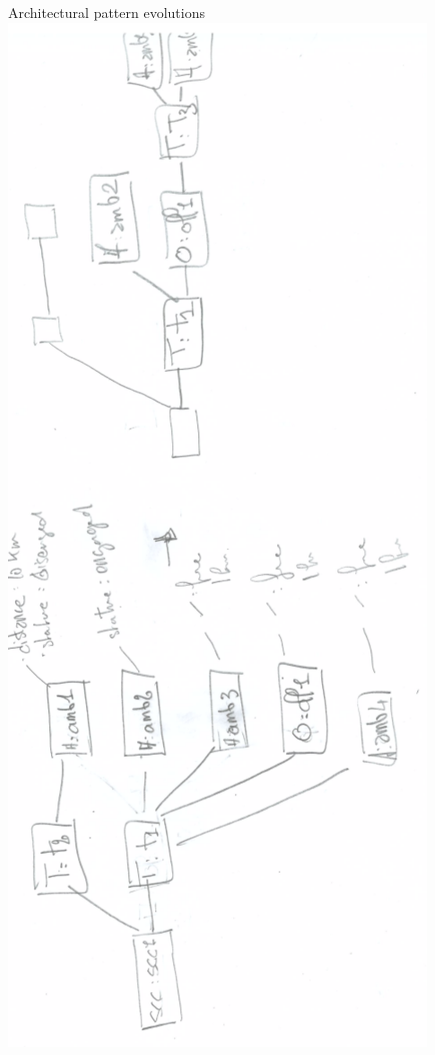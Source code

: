 \documentclass{beamer}
\begin{document}
\begin{frame}{Architectural pattern evolutions}
\includegraphics[angle=-90,scale=0.4]{cas-evolution-pattern}
\end{frame}
\end{document}
